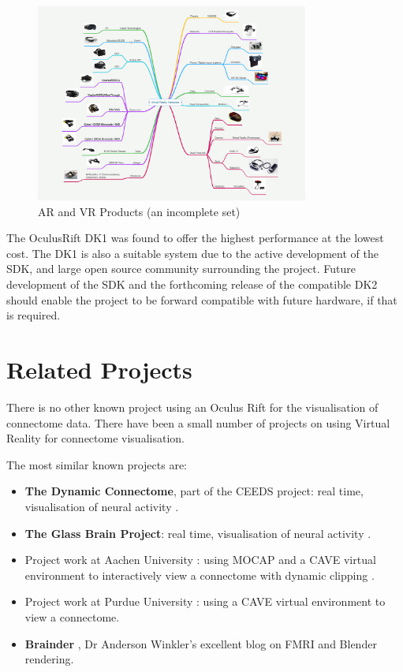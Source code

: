 \documentclass[MSc,paper=a4,pagesize=auto]{icldt}
\begin{document}
\begin{figure}[htbp!]
    \centering
    \includegraphics[width=0.8\textwidth]{resources/vr_headsets}
    \caption{AR and VR Products (an incomplete set)}
    \label{fig:vr_headsets}
\end{figure}

The OculusRift DK1 was found to offer the highest performance at the lowest cost. The DK1 is also a suitable system due to the active development of the SDK, and large open source community surrounding the project. Future development of the SDK and the forthcoming release of the compatible DK2 should enable the project to be forward compatible with future hardware, if that is required.
\section{Related Projects}
There is no other known project using an Oculus Rift for the visualisation of connectome data. There have been a small number of projects on using Virtual Reality for connectome visualisation. 

The most similar known projects are:
\begin{itemize}
  \item \textbf{The Dynamic Connectome}, part of the CEEDS project: real time, visualisation of neural activity \cite{ceeds2014}.
  \item \textbf{The Glass Brain Project}: real time, visualisation of neural activity \cite{GlassBrain2014}.
  \item Project work at Aachen University \cite{Rick2011}: using MOCAP and a CAVE virtual environment to interactively view a connectome with dynamic clipping \cite{ceeds2014}.
  \item Project work at Purdue University \cite{Chen2011}: using a CAVE virtual environment to view a connectome.
  \item \textbf{Brainder} \cite{brainder2014}, Dr Anderson Winkler’s excellent blog on FMRI and Blender rendering.
\end{itemize}
\end{document}
